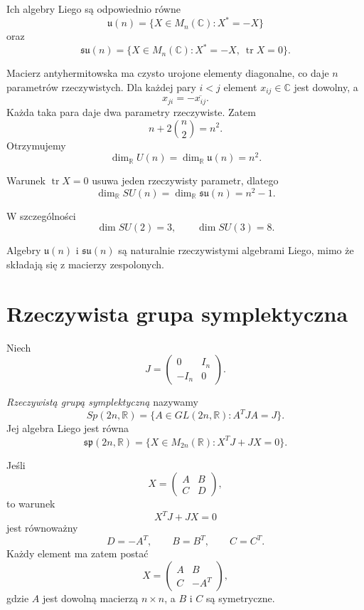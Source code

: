 Ich algebry Liego są odpowiednio równe
\[
\mathfrak u(n)
=
\{X\in M_n(\mathbb C):X^*=-X\}
\]
oraz
\[
\mathfrak{su}(n)
=
\{X\in M_n(\mathbb C):
X^*=-X,\ \operatorname{tr}X=0\}.
\]

Macierz antyhermitowska ma czysto urojone elementy diagonalne,
co daje $n$ parametrów rzeczywistych. Dla każdej pary $i<j$
element $x_{ij}\in\mathbb C$ jest dowolny, a
\[
x_{ji}=-\overline{x_{ij}}.
\]
Każda taka para daje dwa parametry rzeczywiste. Zatem
\[
n+2\binom n2=n^2.
\]
Otrzymujemy
\[
\boxed{
\dim_{\mathbb R}U(n)
=
\dim_{\mathbb R}\mathfrak u(n)
=
n^2.
}
\]

Warunek $\operatorname{tr}X=0$ usuwa jeden rzeczywisty parametr,
dlatego
\[
\boxed{
\dim_{\mathbb R}SU(n)
=
\dim_{\mathbb R}\mathfrak{su}(n)
=
n^2-1.
}
\]

W szczególności
\[
\dim SU(2)=3,
\qquad
\dim SU(3)=8.
\]

Algebry $\mathfrak u(n)$ i $\mathfrak{su}(n)$ są naturalnie
rzeczywistymi algebrami Liego, mimo że składają się z macierzy
zespolonych.



\section{Rzeczywista grupa symplektyczna}


Niech
\[
J=
\begin{pmatrix}
0&I_n\\
-I_n&0
\end{pmatrix}.
\]

\begin{definicja}
\emph{Rzeczywistą grupą symplektyczną} nazywamy
\[
Sp(2n,\mathbb R)
=
\{A\in GL(2n,\mathbb R):A^TJA=J\}.
\]
Jej algebra Liego jest równa
\[
\mathfrak{sp}(2n,\mathbb R)
=
\{X\in M_{2n}(\mathbb R):X^TJ+JX=0\}.
\]
\end{definicja}

Jeśli
\[
X=
\begin{pmatrix}
A&B\\
C&D
\end{pmatrix},
\]
to warunek
\[
X^TJ+JX=0
\]
jest równoważny
\[
D=-A^T,
\qquad
B=B^T,
\qquad
C=C^T.
\]
Każdy element ma zatem postać
\[
X=
\begin{pmatrix}
A&B\\
C&-A^T
\end{pmatrix},
\]
gdzie $A$ jest dowolną macierzą $n\times n$, a $B$ i $C$ są
symetryczne.

